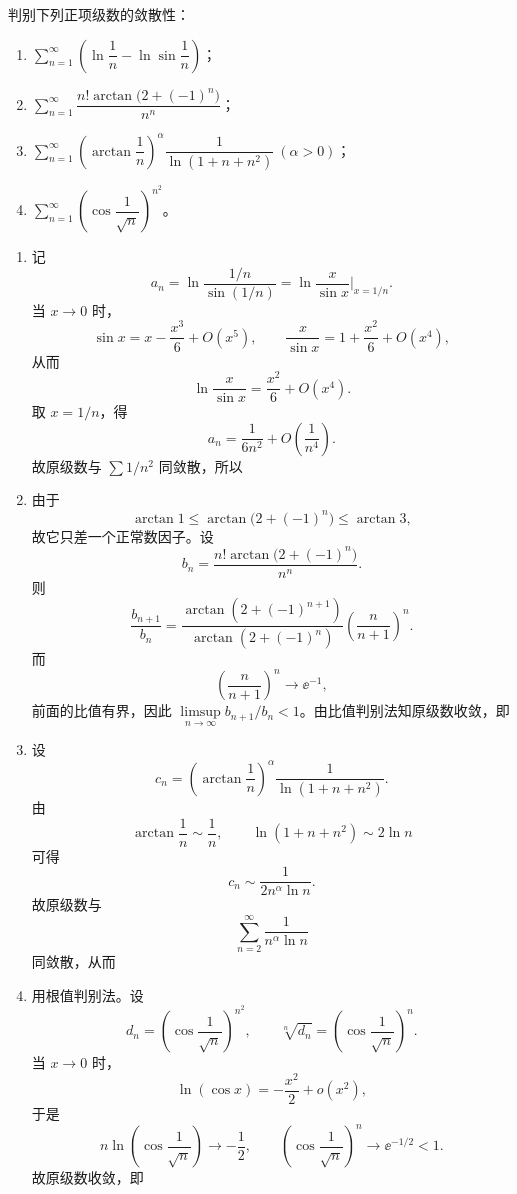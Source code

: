 ﻿

\begin{question}[正项级数的敛散性]

判别下列正项级数的敛散性：
\begin{enumerate}[label=(\arabic*),leftmargin=2.6em,itemsep=0.25em,topsep=0.2em]
\item $\sum_{n=1}^{\infty}\left(\ln \dfrac{1}{n}-\ln \sin \dfrac{1}{n}\right)$；
\item $\sum_{n=1}^{\infty}\dfrac{n!\arctan\!\bigl(2+(-1)^n\bigr)}{n^n}$；
\item $\sum_{n=1}^{\infty}\left(\arctan\dfrac{1}{n}\right)^\alpha\dfrac{1}{\ln(1+n+n^2)}\ (\alpha>0)$；
\item $\sum_{n=1}^{\infty}\left(\cos\dfrac{1}{\sqrt n}\right)^{n^2}$。
\end{enumerate}

\begin{solution}
\begin{enumerate}[label=(\arabic*),leftmargin=2.6em,itemsep=0.25em,topsep=0.2em]
\item 记
\[
a_n=\ln\frac{1/n}{\sin(1/n)}=\ln\frac{x}{\sin x}\Big|_{x=1/n}.
\]
当 $x\to0$ 时，
\[
\sin x=x-\frac{x^3}{6}+O(x^5),
\qquad
\frac{x}{\sin x}=1+\frac{x^2}{6}+O(x^4),
\]
从而
\[
\ln\frac{x}{\sin x}=\frac{x^2}{6}+O(x^4).
\]
取 $x=1/n$，得
\[
a_n=\frac{1}{6n^2}+O\!\left(\frac{1}{n^4}\right).
\]
故原级数与 $\sum 1/n^2$ 同敛散，所以

\item 由于
\[
\arctan 1\le \arctan\!\bigl(2+(-1)^n\bigr)\le \arctan 3,
\]
故它只差一个正常数因子。设
\[
b_n=\frac{n!\arctan\!\bigl(2+(-1)^n\bigr)}{n^n}.
\]
则
\[
\frac{b_{n+1}}{b_n}
=\frac{\arctan(2+(-1)^{n+1})}{\arctan(2+(-1)^n)}
\left(\frac{n}{n+1}\right)^n.
\]
而
\[
\left(\frac{n}{n+1}\right)^n\to \ee^{-1},
\]
前面的比值有界，因此 $\limsup\limits_{n\to\infty} b_{n+1}/b_n<1$。由比值判别法知原级数收敛，即

\item 设
\[
c_n=\left(\arctan\frac1n\right)^\alpha\frac{1}{\ln(1+n+n^2)}.
\]
由
\[
\arctan\frac1n\sim \frac1n,
\qquad
\ln(1+n+n^2)\sim 2\ln n
\]
可得
\[
c_n\sim \frac{1}{2n^\alpha\ln n}.
\]
故原级数与
\[
\sum_{n=2}^{\infty}\frac{1}{n^\alpha\ln n}
\]
同敛散，从而

\item 用根值判别法。设
\[
d_n=\left(\cos\frac{1}{\sqrt n}\right)^{n^2},
\qquad
\sqrt[n]{d_n}=\left(\cos\frac{1}{\sqrt n}\right)^n.
\]
当 $x\to0$ 时，
\[
\ln(\cos x)=-\frac{x^2}{2}+o(x^2),
\]
于是
\[
n\ln\!\left(\cos\frac{1}{\sqrt n}\right)\to -\frac12,
\qquad
\left(\cos\frac{1}{\sqrt n}\right)^n\to \ee^{-1/2}<1.
\]
故原级数收敛，即
\end{enumerate}
\end{solution}
\end{question}

